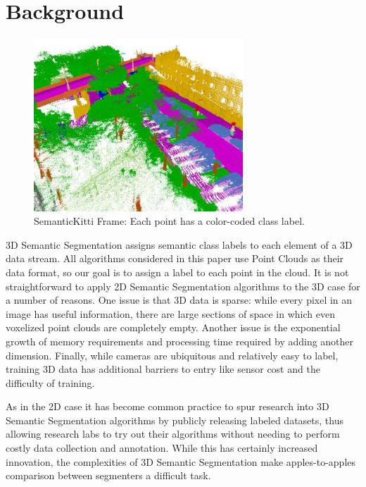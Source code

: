 \section{Background}
\label{chap:background}

\begin{figure}[htp]
  \centering
  \includegraphics[width=0.7\textwidth]{images/semantickitti.jpg}
  \caption{SemanticKitti Frame: Each point has a color-coded class label.}
  \label{fig:semantickitti-frame}
\end{figure}

3D Semantic Segmentation assigns semantic class labels to each element of a 3D data stream. All algorithms considered in this paper use Point Clouds as their data format, so our goal is to assign a label to each point in the cloud. It is not straightforward to apply 2D Semantic Segmentation algorithms to the 3D case for a number of reasons. One issue is that 3D data is sparse: while every pixel in an image has useful information, there are large sections of space in which even voxelized point clouds are completely empty. Another issue is the exponential growth of memory requirements and processing time required by adding another dimension. Finally, while cameras are ubiquitous and relatively easy to label, training 3D data has additional barriers to entry like sensor cost and the difficulty of training.

As in the 2D case it has become common practice to spur research into 3D Semantic Segmentation algorithms by publicly releasing labeled datasets, thus allowing research labs to try out their algorithms without needing to perform costly data collection and annotation. While this has certainly increased innovation, the complexities of 3D Semantic Segmentation make apples-to-apples comparison between segmenters a difficult task.

